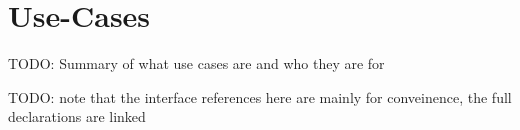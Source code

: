 \chapter{Use-Cases}
\label{chap:use-cases}

TODO: Summary of what use cases are and who they are for

TODO: note that the interface references here are mainly for conveinence, the
full declarations are linked
